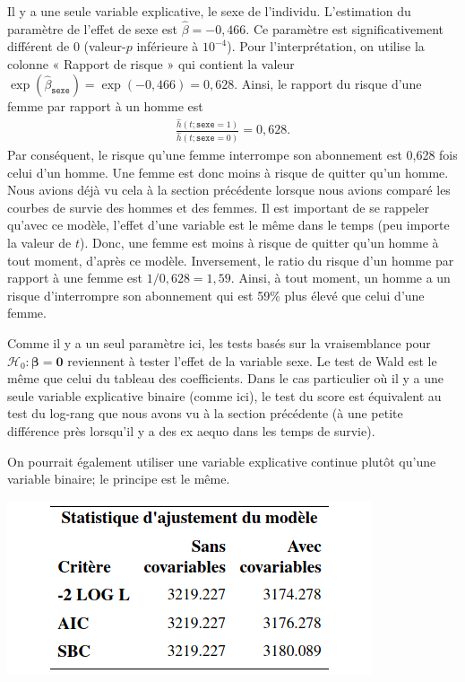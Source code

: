 \documentclass[
  11pt,
  letterpaper,
]{book}
\theoremstyle{definition}
\theoremstyle{definition}
\theoremstyle{definition}
\theoremstyle{definition}
\theoremstyle{remark}
\begin{document}
Il y a une seule variable explicative, le sexe de l'individu. L'estimation du paramètre de l'effet de sexe est \(\hat{\beta}=-0,466\). Ce paramètre est significativement différent de \(0\) (valeur-\(p\) inférieure à \(10^{-4}\)). Pour l'interprétation, on utilise la colonne « Rapport de risque » qui contient la valeur \(\exp(\hat{\beta}_{\texttt{sexe}}) = \exp(-0,466) = 0,628\). Ainsi, le rapport du risque d'une femme par rapport à un homme est
\begin{align*}
 \frac{\hat{h}(t; \texttt{sexe}=1)}{\hat{h}(t; \texttt{sexe}=0)}= 0,628.
\end{align*}
Par conséquent, le risque qu'une femme interrompe son abonnement est 0,628 fois celui d'un homme. Une femme est donc moins à risque de quitter qu'un homme. Nous avions déjà vu cela à la section précédente lorsque nous avions comparé les courbes de survie des hommes et des femmes. Il est important de se rappeler qu'avec ce modèle, l'effet d'une variable est le même dans le temps (peu importe la valeur de \(t\)). Donc, une femme est moins à risque de quitter qu'un homme à tout moment, d'après ce modèle. Inversement, le ratio du risque d'un homme par rapport à une femme est \(1/0,628=1,59\). Ainsi, à tout moment, un homme a un risque d'interrompre son abonnement qui est 59\% plus élevé que celui d'une femme.

Comme il y a un seul paramètre ici, les tests basés sur la vraisemblance pour \(\mathcal{H}_0: \boldsymbol{\beta}=\boldsymbol{0}\) reviennent à tester l'effet de la variable sexe. Le test de Wald est le même que celui du tableau des coefficients. Dans le cas particulier où il y a une seule variable explicative binaire (comme ici), le test du score est équivalent au test du log-rang que nous avons vu à la section précédente (à une petite différence près lorsqu'il y a des ex aequo dans les temps de survie).

On pourrait également utiliser une variable explicative continue plutôt qu'une variable binaire; le principe est le même.

\begin{center}\includegraphics[width=0.45\linewidth]{figures/05-survie-e13} \end{center}
\end{document}
